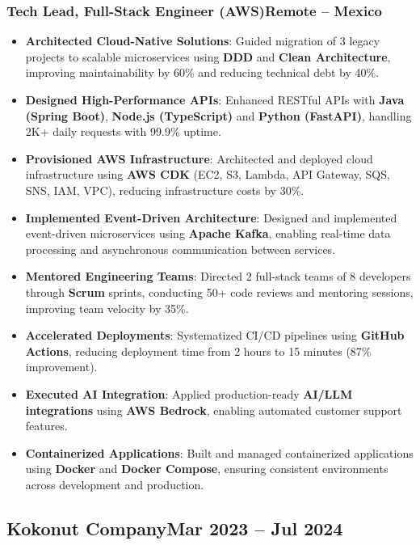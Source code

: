 \documentclass[a4paper,10pt]{article}
\newcommand{\kw}[1]{\textbf{\textcolor{keyword}{#1}}}
\newcommand{\tech}[1]{\textbf{\textcolor{tech}{#1}}}
\begin{document}
\subsubsection*{\small Tech Lead, Full-Stack Engineer (AWS)\hfill Remote -- Mexico}
\begin{itemize}[noitemsep, leftmargin=*]
    \item \textbf{Architected Cloud-Native Solutions}: Guided migration of 3 legacy projects to scalable microservices using \kw{DDD} and \kw{Clean Architecture}, improving maintainability by 60\% and reducing technical debt by 40\%.
    \item \textbf{Designed High-Performance APIs}: Enhanced RESTful APIs with \tech{Java (Spring Boot)}, \tech{Node.js (TypeScript)} and \tech{Python (FastAPI)}, handling 2K+ daily requests with 99.9\% uptime.
    \item \textbf{Provisioned AWS Infrastructure}: Architected and deployed cloud infrastructure using \tech{AWS CDK} (EC2, S3, Lambda, API Gateway, SQS, SNS, IAM, VPC), reducing infrastructure costs by 30\%.
    \item \textbf{Implemented Event-Driven Architecture}: Designed and implemented event-driven microservices using \tech{Apache Kafka}, enabling real-time data processing and asynchronous communication between services.
    \item \textbf{Mentored Engineering Teams}: Directed 2 full-stack teams of 8 developers through \kw{Scrum} sprints, conducting 50+ code reviews and mentoring sessions, improving team velocity by 35\%.
    \item \textbf{Accelerated Deployments}: Systematized CI/CD pipelines using \tech{GitHub Actions}, reducing deployment time from 2 hours to 15 minutes (87\% improvement).
    \item \textbf{Executed AI Integration}: Applied production-ready \kw{AI/LLM integrations} using \tech{AWS Bedrock}, enabling automated customer support features.
    \item \textbf{Containerized Applications}: Built and managed containerized applications using \tech{Docker} and \tech{Docker Compose}, ensuring consistent environments across development and production.
\end{itemize}

\subsection*{\small Kokonut Company\hfill\textbf{Mar 2023 -- Jul 2024}}
\end{document}
